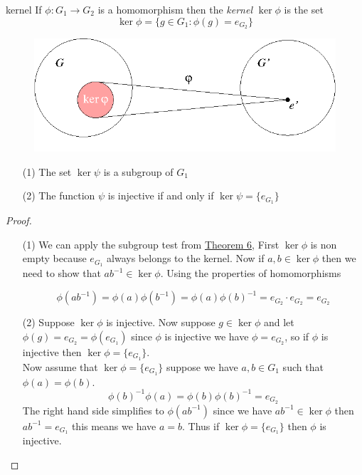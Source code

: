 \documentclass[16pt,a4paper]{article}
\theoremstyle{definition}
\begin{document}
\begin{defn}{kernel}{}
If $\phi: G_1\rightarrow G_2$ is a homomorphism then the \textit{kernel} $\ker\phi$  is the set
\[\ker \phi = \{g\in G_1 : \phi(g) = e_{G_2}\}\]
\end{defn}
\begin{figure}[hbtp]
\centering
\includegraphics[scale=0.7]{figs/fig0.png}
\end{figure}


\begin{thm}{}{}
\begin{itemize}
\item[(1)] The set $\ker \psi$ is a subgroup of $G_1$
\item[(2)] The function $\psi$ is injective if and only if $\ker\psi = \{e_{G_1}\}$
\end{itemize}
\end{thm}
\begin{proof}
\begin{itemize}
\item[(1)] We can apply the subgroup test  from \hyperref[test]{Theorem 6}, First $\ker \phi$ is non empty because $e_{G_1}$ always belongs to the kernel. Now if $a,b\in \ker \phi$ then we need to show that $ab^{-1}\in \ker \phi$. Using the properties of homomorphisms 

\[\phi(ab^{-1}) = \phi(a)\phi(b^{-1}) = \phi(a)\phi(b)^{-1} = e_{G_2}\cdot e_{G_2} = e_{G_2}\]


\item[(2)] Suppose $\ker \phi$ is injective. Now suppose $g\in \ker \phi$ and let $\phi(g) = e_{G_2} = \phi(e_{G_1})$ since $\phi$ is injective we have $\phi = e_{G_2}$, so if $\phi$ is injective then $\ker \phi = \{e_{G_1}\}$. 
\\
Now assume that $\ker \phi = \{e_{G_1}\}$ suppose we have $a,b\in G_1$ such that $\phi(a) = \phi(b)$. 
\[\phi(b)^{-1}\phi(a) = \phi(b)\phi(b)^{-1} = e_{G_2}\]
The right hand side simplifies to $\phi(ab^{-1})$ since we have $ab^{-1}\in \ker\phi$ then $ab^{-1}=e_{G_1}$ this means we have $a=b$. Thus if $\ker\phi = \{e_{G_1}\}$ then $\phi$ is injective. 
\end{itemize}
\end{proof}
\end{document}
